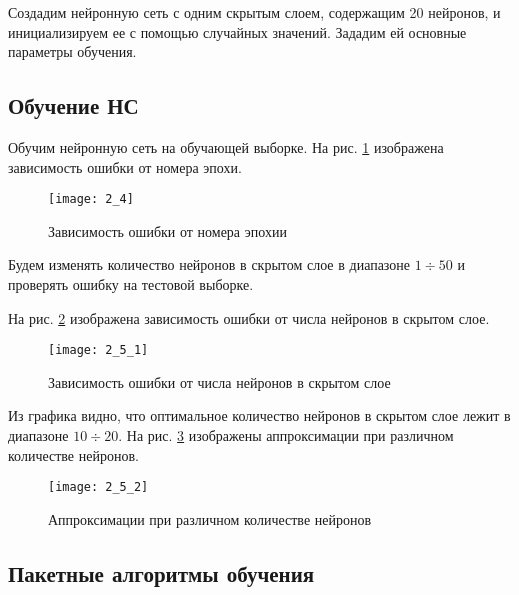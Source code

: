 Создадим нейронную сеть с одним скрытым слоем, содержащим 20 нейронов, и инициализируем ее с помощью случайных значений. Зададим ей основные параметры обучения.



\subsection{Обучение НС}

Обучим нейронную сеть на обучающей выборке. На рис. \ref{fig:2_4} изображена зависимость ошибки от номера эпохи.
\begin{figure}[H]
\begin{center}
	\texttt{[image: 2\_4]}
	\caption{Зависимость ошибки от номера эпохии}
	\label{fig:2_4}
\end{center}
\end{figure}

Будем изменять количество нейронов в скрытом слое в диапазоне $1 \div 50$ и проверять ошибку на тестовой выборке. 

%

На рис. \ref{fig:2_5_1} изображена зависимость ошибки от числа нейронов в скрытом слое.
\begin{figure}[H]
\begin{center}
	\texttt{[image: 2\_5\_1]}
	\caption{Зависимость ошибки от числа нейронов в скрытом слое}
	\label{fig:2_5_1}
\end{center}
\end{figure}
\vspace{-0.5cm}

Из графика видно, что оптимальное количество нейронов в скрытом слое лежит в диапазоне $10 \div 20$. На рис. \ref{fig:2_5_2} изображены аппроксимации при различном количестве нейронов.
\vspace{-0.5cm}
\begin{figure}[H]
\begin{center}
	\texttt{[image: 2\_5\_2]}
	\caption{Аппроксимации при различном количестве нейронов}
	\label{fig:2_5_2}
\end{center}
\end{figure}

\subsection{Пакетные алгоритмы обучения}

